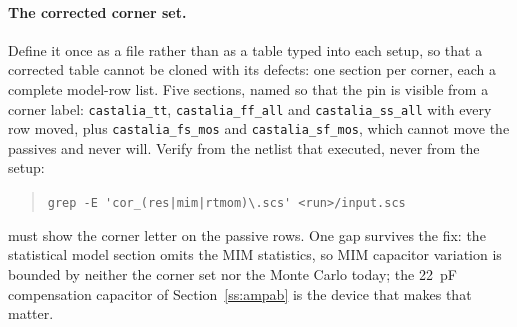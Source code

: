 \paragraph{The corrected corner set.} Define it once as a file rather than as a
table typed into each setup, so that a corrected table cannot be cloned with its
defects: one section per corner, each a complete model-row list. Five sections,
named so that the pin is visible from a corner label:
\texttt{castalia\_tt}, \texttt{castalia\_ff\_all} and \texttt{castalia\_ss\_all}
with every row moved, plus \texttt{castalia\_fs\_mos} and
\texttt{castalia\_sf\_mos}, which cannot move the passives and never will.
Verify from the netlist that executed, never from the setup:

\begin{quote}\small
\verb+grep -E 'cor_(res|mim|rtmom)\.scs' <run>/input.scs+
\end{quote}

\noindent must show the corner letter on the passive rows. One gap survives the
fix: the statistical model section omits the MIM statistics, so MIM capacitor
variation is bounded by neither the corner set nor the Monte Carlo today; the
\SI{22}{\pico\farad} compensation capacitor of Section~\ref{ss:ampab} is the
device that makes that matter.






\FloatBarrier












\FloatBarrier


